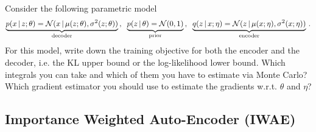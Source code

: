 \begin{exercise}
    Consider the following parametric model
    \begin{align}
        \underbrace{p(x\,|\, z;\theta) = \mathcal{N}(x\,|\, \mu(z;\theta),\sigma^2(z;\theta))}_{\text{decoder}}\,,\;\;\underbrace{p(z\,|\, \theta) = \mathcal{N}(0,1)}_{\text{prior}}\,,\;\; \underbrace{q(z\,|\, x;\eta) = \mathcal{N}(z\,|\, \mu(x;\eta),\sigma^2(x;\eta))}_{\text{encoder}}\,.
    \end{align}
    For this model, write down the training objective for both the encoder and the decoder, i.e. the KL upper bound or the log-likelihood lower bound. Which integrals you can take and which of them you have to estimate via Monte Carlo? Which gradient estimator you should use to estimate the gradients w.r.t. $\theta$ and $\eta$?
\end{exercise}

\subsection{Importance Weighted Auto-Encoder (IWAE) \citep{burda2015importance}}

